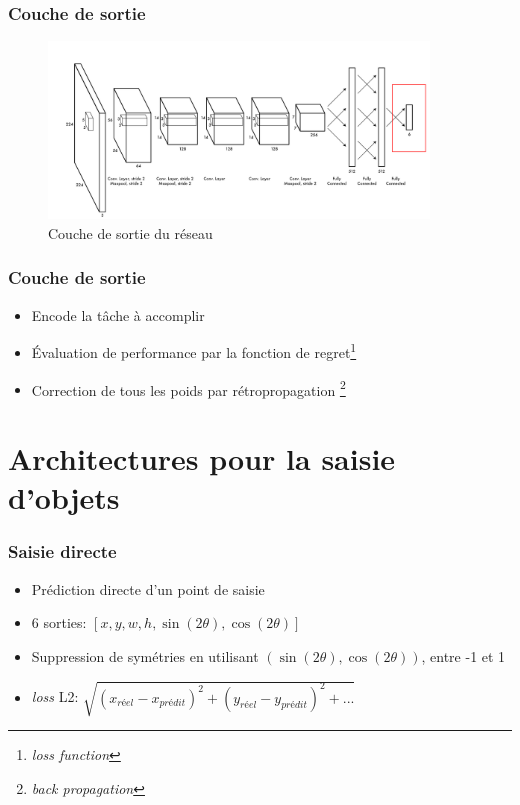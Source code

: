 \documentclass{beamer}
\begin{document}
\begin{frame}
  \frametitle{Couche de sortie}
  \begin{figure}
    \centering
    \includegraphics[width=0.9\textwidth]{img/last-layer.png}
    \caption{Couche de sortie du réseau}
    \label{fig:last_layer}
  \end{figure}
\end{frame}

\begin{frame}
  \frametitle{Couche de sortie}
  \begin{itemize}
  \item Encode la tâche à accomplir
  \item Évaluation de performance par la fonction de regret\footnote{\emph{loss function}}
  \item Correction de tous les poids par rétropropagation \footnote{\emph{back propagation}}
  \end{itemize}
\end{frame}

\section{Architectures pour la saisie d'objets}

\begin{frame}
  \frametitle{Saisie directe}
  \begin{itemize}
  \item Prédiction directe d'un point de saisie
  \item 6 sorties: $[x, y, w, h, \sin(2\theta), \cos(2\theta)]$
  \item Suppression de symétries en utilisant $(\sin(2\theta), \cos(2\theta))$,
    entre -1 et 1
  \item \emph{loss} L2: $\sqrt{(x_{réel} - x_{prédit})^2 + (y_{réel} - y_{prédit})^2
    + ...}$
  \end{itemize}
  
\end{frame}
\end{document}

